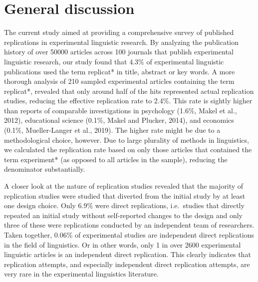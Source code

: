 \documentclass[]{elsarticle} %
\begin{document}
\hypertarget{general-discussion}{%
\section{General discussion}\label{general-discussion}}

The current study aimed at providing a comprehensive survey of published replications in experimental linguistic research.
By analyzing the publication history of over 50000 articles across 100 journals that publish experimental linguistic research, our study found that 4.3\% of experimental linguistic publications used the term replicat* in title, abstract or key words.
A more thorough analysis of 210 sampled experimental articles containing the term replicat*, revealed that only around half of the hits represented actual replication studies, reducing the effective replication rate to 2.4\%. This rate is sightly higher than reports of comparable investigations in psychology (1.6\%, Makel et al., 2012), educational science (0.1\%, Makel and Plucker, 2014), and economics (0.1\%, Mueller-Langer et al., 2019). The higher rate might be due to a methodological choice, however. Due to large plurality of methods in linguistics, we calculated the replication rate based on only those articles that contained the term experiment* (as opposed to all articles in the sample), reducing the denominator substantially.

A closer look at the nature of replication studies revealed that the majority of replication studies were studied that diverted from the initial study by at least one design choice. Only 6.9\% were direct replications, i.e.~studies that directly repeated an initial study without self-reported changes to the design and only three of these were replications conducted by an independent team of researchers.
Taken together, 0.06\% of experimental studies are independent direct replications in the field of linguistics. Or in other words, only 1 in over 2600 experimental linguistic articles is an independent direct replication. This clearly indicates that replication attempts, and especially independent direct replication attempts, are very rare in the experimental linguistics literature.
\end{document}
